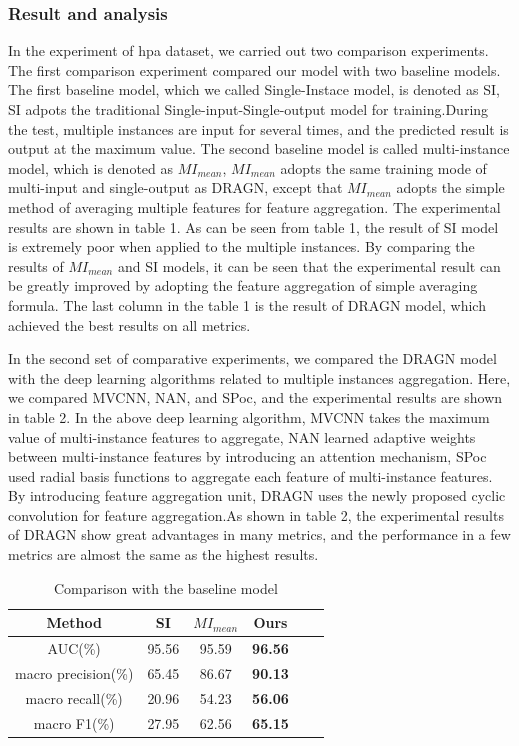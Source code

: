 \documentclass[10pt,twocolumn,letterpaper]{article}
\begin{document}
\subsubsection{Result and analysis}
In the experiment of hpa dataset, we carried out two comparison experiments. The first comparison experiment compared our model with two baseline models. The first baseline model, which we called Single-Instace model, is denoted as SI, SI adpots the traditional Single-input-Single-output model for training.During the test, multiple instances are input for several times, and the predicted result is output at the maximum value. The second baseline model is called multi-instance model, which is denoted as $MI_{mean}$, $MI_{mean}$ adopts the same training mode of multi-input and single-output as DRAGN, except that $MI_{mean}$ adopts the simple method of averaging multiple features for feature aggregation. The experimental results are shown in table 1. As can be seen from table 1, the result of SI model is extremely poor when applied to the multiple instances. By comparing the results of $MI_{mean}$ and SI models, it can be seen that the experimental result can be greatly improved by adopting the feature aggregation of simple averaging formula. The last column in the table 1 is the result of DRAGN model, which achieved the best results on all metrics.

In the second set of comparative experiments, we compared the DRAGN model with the deep learning algorithms related to multiple instances aggregation. Here, we compared MVCNN, NAN, and SPoc\cite{ref28}, and the experimental results are shown in table 2. In the above deep learning algorithm, MVCNN takes the maximum value of multi-instance features to aggregate, NAN learned adaptive weights between multi-instance features by introducing an attention mechanism, SPoc used radial basis functions to aggregate each feature of multi-instance features. By introducing feature aggregation unit, DRAGN uses the newly proposed cyclic convolution for feature aggregation.As shown in table 2, the experimental results of DRAGN show great advantages in many metrics, and the performance in a few metrics are almost the same as the highest results.

\begin{table}
\normalsize
\begin{center}
\begin{tabular}{|c|c|c|c|c|c|}
\hline
Method & SI & $MI_{mean}$ & Ours \\
\hline\hline
AUC(\%) & 95.56 & 95.59  & \textbf{96.56} \\
macro precision(\%) & 65.45 & 86.67 & \textbf{90.13} \\
macro recall(\%) & 20.96 & 54.23 & \textbf{56.06} \\
macro F1(\%) & 27.95 & 62.56 & \textbf{65.15} \\
\hline
\end{tabular}
\end{center}
\caption{Comparison with the baseline model}
\end{table}
\end{document}
